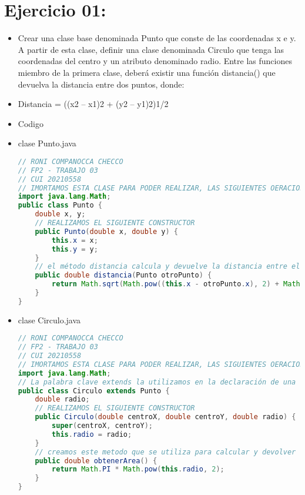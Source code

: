 \documentclass{article}
\begin{document}
    \section{Ejercicio 01:}
	\begin{itemize}
        \item Crear una clase base denominada Punto que conste de las coordenadas x e y. A partir de esta clase, definir una clase denominada Circulo que tenga las coordenadas del centro y un atributo denominado radio. Entre las funciones miembro de la primera clase, deberá existir una función distancia() que devuelva la distancia entre dos puntos, donde:
        \item Distancia = ((x2 – x1)2 + (y2 – y1)2)1/2
        \item Codigo
        \item clase Punto.java
        \begin{lstlisting}[language=java]
// RONI COMPANOCCA CHECCO
// FP2 - TRABAJO 03
// CUI 20210558
// IMORTAMOS ESTA CLASE PARA PODER REALIZAR, LAS SIGUIENTES OERACIONES MATEMATICAS
import java.lang.Math;
public class Punto {
    double x, y;
    // REALIZAMOS EL SIGUIENTE CONSTRUCTOR
    public Punto(double x, double y) {
        this.x = x;
        this.y = y;
    }
    // el método distancia calcula y devuelve la distancia entre el punto actual (this) y otro punto (otroPunto)
    public double distancia(Punto otroPunto) {
        return Math.sqrt(Math.pow((this.x - otroPunto.x), 2) + Math.pow((this.y - otroPunto.y), 2));
    }
}
        \end{lstlisting}

        \item clase Circulo.java
        \begin{lstlisting}[language=java]
// RONI COMPANOCCA CHECCO
// FP2 - TRABAJO 03
// CUI 20210558
// IMORTAMOS ESTA CLASE PARA PODER REALIZAR, LAS SIGUIENTES OERACIONES MATEMATICAS
import java.lang.Math;
// La palabra clave extends la utilizamos en la declaración de una clase para indicar que la clase que estamos declarando es una subclase
public class Circulo extends Punto {
    double radio;
    // REALIZAMOS EL SIGUIENTE CONSTRUCTOR
    public Circulo(double centroX, double centroY, double radio) {
        super(centroX, centroY);
        this.radio = radio;
    }
    // creamos este metodo que se utiliza para calcular y devolver el área de un círculo.
    public double obtenerArea() {
        return Math.PI * Math.pow(this.radio, 2);
    }
}
        \end{lstlisting}


\end{itemize}
\end{document}
